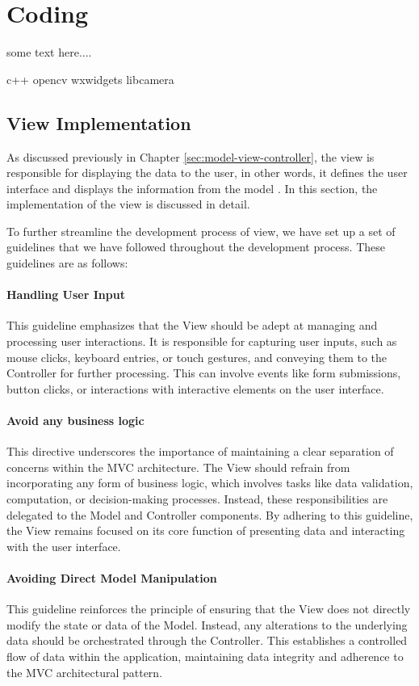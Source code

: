 \chapter{Coding}
\label{chapter:coding}

some text here....

c++
opencv
wxwidgets
libcamera


\section{View Implementation}
As discussed previously in Chapter \ref{sec:model-view-controller}, the view is responsible for displaying the data to the user, in other words,  it defines the user interface and displays the information from the model \cite{Krastev20}. In this section, the implementation of the view is discussed in detail.

To further streamline the development process of view, we have set up a set of guidelines that we have followed throughout the development process. These guidelines are as follows:

\subsubsection{Handling User Input}
This guideline emphasizes that the View should be adept at managing and processing user interactions. It is responsible for capturing user inputs, such as mouse clicks, keyboard entries, or touch gestures, and conveying them to the Controller for further processing. This can involve events like form submissions, button clicks, or interactions with interactive elements on the user interface.

\subsubsection{Avoid any business logic}
This directive underscores the importance of maintaining a clear separation of concerns within the MVC architecture. The View should refrain from incorporating any form of business logic, which involves tasks like data validation, computation, or decision-making processes. Instead, these responsibilities are delegated to the Model and Controller components. By adhering to this guideline, the View remains focused on its core function of presenting data and interacting with the user interface.

\subsubsection{Avoiding Direct Model Manipulation}
This guideline reinforces the principle of ensuring that the View does not directly modify the state or data of the Model. Instead, any alterations to the underlying data should be orchestrated through the Controller. This establishes a controlled flow of data within the application, maintaining data integrity and adherence to the MVC architectural pattern.

